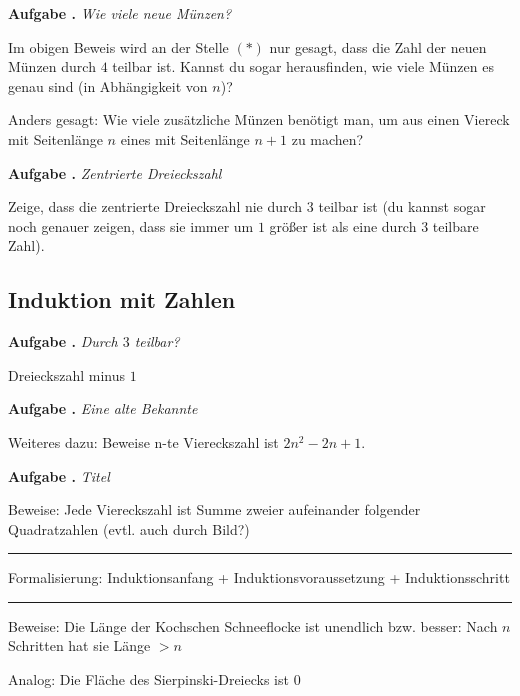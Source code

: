 \documentclass[a4paper,ngerman,12pt]{scrartcl}
\theoremstyle{definition}
\theoremstyle{plain}
\theoremstyle{remark}
\newlength{\aufgabenskip}
\newcounter{aufgabennummer}
\newenvironment{aufgabe}[1]{
	\addtocounter{aufgabennummer}{1}
	\textbf{Aufgabe \theaufgabennummer.} \emph{#1} \par
}{\vspace{\aufgabenskip}}
\begin{document}
\begin{aufgabe}{Wie viele neue Münzen?}
	Im obigen Beweis wird an der Stelle $(\ast)$ nur gesagt, dass die Zahl der neuen Münzen durch $4$ teilbar ist. Kannst du sogar herausfinden, wie viele Münzen es genau sind (in Abhängigkeit von $n$)?
	
	Anders gesagt: Wie viele zusätzliche Münzen benötigt man, um aus einen Viereck mit Seitenlänge $n$ eines mit Seitenlänge $n+1$ zu machen?
\end{aufgabe}

\begin{aufgabe}{Zentrierte Dreieckszahl}
	
	Zeige, dass die zentrierte Dreieckszahl nie durch $3$ teilbar ist (du kannst sogar noch genauer zeigen, dass sie immer um $1$ größer ist als eine durch $3$ teilbare Zahl).
\end{aufgabe}

\subsection{Induktion mit Zahlen}



\begin{aufgabe}{Durch $3$ teilbar?}
	Dreieckszahl minus $1$
\end{aufgabe}

\begin{aufgabe}{Eine alte Bekannte}
	Weiteres dazu: Beweise n-te Viereckszahl ist $2n^2-2n+1$.
\end{aufgabe}

\begin{aufgabe}{Titel}
	Beweise: Jede Viereckszahl ist Summe zweier aufeinander folgender Quadratzahlen (evtl. auch durch Bild?)
\end{aufgabe}

\hrule

Formalisierung: Induktionsanfang + Induktionsvoraussetzung + Induktionsschritt

\hrule

Beweise: Die Länge der Kochschen Schneeflocke ist unendlich bzw. besser: Nach $n$ Schritten hat sie Länge $> n$

Analog: Die Fläche des Sierpinski-Dreiecks ist $0$
\end{document}
